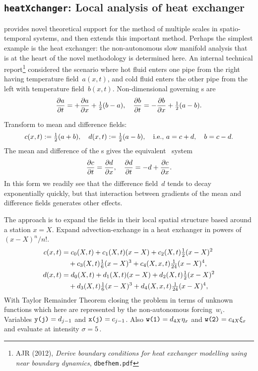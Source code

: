 \subsection{\texttt{heatXchanger}: Local analysis of heat exchanger} 
\label{heatXchanger}


\cite{Roberts2013a} provides novel theoretical support for the method of multiple scales in spatio-temporal systems, and then extends this important method.
Perhaps the simplest example is the heat exchanger: the non-autonomous slow manifold analysis that is at the heart of the novel methodology is determined here.
An internal technical report\footnote{AJR (2012), \emph{Derive boundary conditions for heat exchanger modelling using near boundary dynamics}, \texttt{dbefhem.pdf}} considered the scenario where hot fluid enters one pipe from the right having temperature field~$a(x,t)$, and cold fluid enters the other pipe from the left with temperature field~$b(x,t)$.  
Non-dimensional governing \pde{}s are
\begin{equation*}
\D ta=+\D xa+\rat12(b-a),\quad
\D tb=-\D xb+\rat12(a-b).
\label{eq:hepde}
\end{equation*}

Transform to mean and difference fields:
\begin{equation*}
c(x,t):={\tfrac{1}{2}}(a+b),\quad d(x,t):={\tfrac{1}{2}}(a-b),
\quad\mbox{i.e., }
a=c+d,\quad b=c-d.
\label{eq:meandiff}
\end{equation*}
The mean and difference of the \pde{}s gives the equivalent \pde\ system
\begin{equation*}
\D tc=\D xd,\quad
\D td=-d+\D xc.
\label{eq:hecan}
\end{equation*}
In this form we readily see that the difference field~$d$ tends to decay exponentially quickly, but that interaction between gradients of the mean and difference fields generates other effects.

The approach is to expand the fields in their local spatial structure based around a station $x=X$.
Expand advection-exchange in a heat exchanger in powers of $(x-X)^n/n!$.
\begin{align*}
c(x,t)&=c_0(X,t)+c_1(X,t)(x-X) +c_2(X,t){\tfrac{1}{2}}(x-X)^2
\nonumber\\&\quad{}
+c_3(X,t){\tfrac{1}{6}}(x-X)^3
 +c_4(X,x,t){\tfrac{1}{24}}(x-X)^4,
\\
d(x,t)&=d_0(X,t)+d_1(X,t)(x-X) +d_2(X,t){\tfrac{1}{2}}(x-X)^2
\nonumber\\&\quad{}
+d_3(X,t){\tfrac{1}{6}}(x-X)^3 
+d_4(X,x,t){\tfrac{1}{24}}(x-X)^4,
\end{align*}
With Taylor Remainder Theorem closing the problem in terms of unknown functions which here are represented by the non-autonomous forcing~$w_i$.
Variables \(\verb|y(j)|=d_{j-1}\) and \(\verb|x(j)|=c_{j-1}\).  
Also \(\verb|w(1)|=d_{4X}\eta_x\) and \(\verb|w(2)|=c_{4X}\xi_x\) and evaluate at intensity $\sigma=5$\,.

